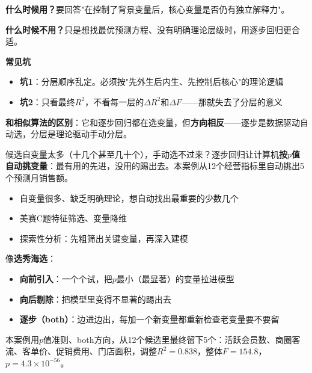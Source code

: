 \begin{algonotes}
\textbf{什么时候用？}要回答"在控制了背景变量后，核心变量是否仍有独立解释力"。

\textbf{什么时候不用？}只是想找最优预测方程、没有明确理论层级时，用逐步回归更合适。

\textbf{常见坑}
\begin{itemize}
    \item \textbf{坑1}：分层顺序乱定。必须按"先外生后内生、先控制后核心"的理论逻辑
    \item \textbf{坑2}：只看最终$R^2$，不看每一层的$\Delta R^2$和$\Delta F$——那就失去了分层的意义
\end{itemize}

\textbf{和相似算法的区别}：它和逐步回归都在选变量，但\textbf{方向相反}——逐步是数据驱动自动选，分层是理论驱动手动分层。
\end{algonotes}


\begin{algointro}
候选自变量太多（十几个甚至几十个），手动选不过来？逐步回归让计算机\textbf{按$p$值自动挑变量}：最有用的先进，没用的踢出去。本案例从12个经营指标里自动挑出5个预测月销售额。
\end{algointro}

\begin{algoscene}
\begin{itemize}
    \item 自变量很多、缺乏明确理论，想自动找出最重要的少数几个
    \item 美赛C题特征筛选、变量降维
    \item 探索性分析：先粗筛出关键变量，再深入建模
\end{itemize}
\end{algoscene}

\begin{algoprinciple}
像\textbf{选秀海选}：
\begin{itemize}
    \item \textbf{向前引入}：一个个试，把$p$最小（最显著）的变量拉进模型
    \item \textbf{向后剔除}：把模型里变得不显著的踢出去
    \item \textbf{逐步（both）}：边进边出，每加一个新变量都重新检查老变量要不要留
\end{itemize}

本案例用$p$值准则、both方向，从12个候选里最终留下5个：活跃会员数、商圈客流、客单价、促销费用、门店面积，调整$R^2=0.838$，整体$F=154.8$，$p=4.3\times10^{-56}$。
\end{algoprinciple}

